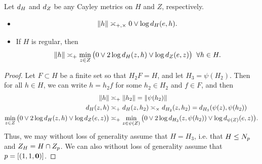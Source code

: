 {\begin{lemma}
\label{lemmaCROSSONCTquasi}
Let $d_H$ and $d_Z$ be any Cayley metrics on $H$ and $Z$, respectively.
\begin{itemize}
\item[(i)]
\begin{equation}
\label{CROSSONCTquasi1}
\|h\| \asymp_{+,\times} 0\vee \log d_H(e,h).
\end{equation}
\item[(ii)] If $H$ is regular, then
\begin{equation}
\label{CROSSONCTquasi2}
\|h\| \asymp_+ \min_{z\in Z} \big(0\vee 2\log d_H(z,h) \vee \log d_Z(e,z)\big)  \;\;\forall h\in H.
\end{equation}
\end{itemize}
\end{lemma}
\begin{proof}
Let $F\subset H$ be a finite set so that $H_2 F = H$, and let $H_3 = \psi(H_2)$. Then for all $h\in H$, we can write $h = h_2 f$ for some $h_2\in H_2$ and $f\in F$, and then
\begin{align*}
\|h\| &\asymp_+ \|h_2\| = \|\psi(h_2)\|\\
d_H(z,h) &\asymp_+ d_H(z,h_2) \asymp_\times d_{H_2}(z,h_2) = d_{H_3}(\psi(z),\psi(h_2))\\
\min_{z\in Z} \big(0\vee 2\log d_H(z,h) \vee \log d_Z(e,z)\big) & \asymp_+ \min_{z\in \psi(Z)} \big(0\vee 2\log d_{H_3}(z,\psi(h_2)) \vee \log d_{\psi(Z)}(e,z)\big).
\end{align*}
Thus, we may without loss of generality assume that $H = H_3$, i.e. that $H\leq N_p$ and $Z_H = H\cap Z_p$. We can also without loss of generality assume that $p = [(1,1,\mathbf 0)]$.


\end{proof}}

